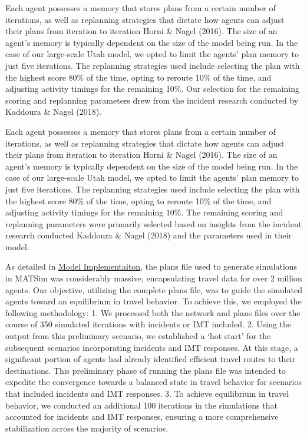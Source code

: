 \documentclass[fancy, oneside, mastersfancy, ms]{byuthesis}
\begin{document}
Each agent possesses a memory that stores plans from a certain number of
iterations, as well as replanning strategies that dictate how agents can
adjust their plans from iteration to iteration Horni \& Nagel (2016).
The size of an agent's memory is typically dependent on the size of the
model being run. In the case of our large-scale Utah model, we opted to
limit the agents' plan memory to just five iterations. The replanning
strategies used include selecting the plan with the highest score 80\%
of the time, opting to reroute 10\% of the time, and adjusting activity
timings for the remaining 10\%. Our selection for the remaining scoring
and replanning parameters drew from the incident research conducted by
Kaddoura \& Nagel (2018).

Each agent possesses a memory that stores plans from a certain number of
iterations, as well as replanning strategies that dictate how agents can
adjust their plans from iteration to iteration Horni \& Nagel (2016).
The size of an agent's memory is typically dependent on the size of the
model being run. In the case of our large-scale Utah model, we opted to
limit the agents' plan memory to just five iterations. The replanning
strategies used include selecting the plan with the highest score 80\%
of the time, opting to reroute 10\% of the time, and adjusting activity
timings for the remaining 10\%. The remaining scoring and replanning
parameters were primarily selected based on insights from the incident
research conducted Kaddoura \& Nagel (2018) and the parameters used in
their model.

As detailed in \protect\hyperlink{sec-model_imp}{Model Implementaiton},
the plans file used to generate simulations in MATSim was considerably
massive, encapsulating travel data for over 2 million agents. Our
objective, utilizing the complete plans file, was to guide the simulated
agents toward an equilibrium in travel behavior. To achieve this, we
employed the following methodology: 1. We processed both the network and
plans files over the course of 350 simulated iterations with incidents
or IMT included. 2. Using the output from this preliminary scenario, we
established a `hot start' for the subsequent scenarios incorporating
incidents and IMT responses. At this stage, a significant portion of
agents had already identified efficient travel routes to their
destinations. This preliminary phase of running the plans file was
intended to expedite the convergence towards a balanced state in travel
behavior for scenarios that included incidents and IMT responses. 3. To
achieve equilibrium in travel behavior, we conducted an additional 100
iterations in the simulations that accounted for incidents and IMT
responses, ensuring a more comprehensive stabilization across the
majority of scenarios.
\end{document}
